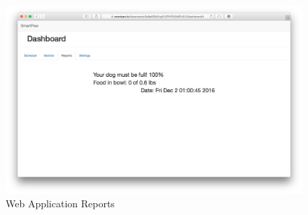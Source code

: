 \documentclass[12pt]{article}
\begin{document}
\begin{appendix}
  \begin{figure}[!htb]
    \begin{center}
        \includegraphics[scale=0.15]{Figures/WebApp5.png}
    \end{center}
    \caption{Web Application Reports}
    \label{fig:WebApp5}
  \end{figure}

\end{appendix}
\newpage

\end{document}
